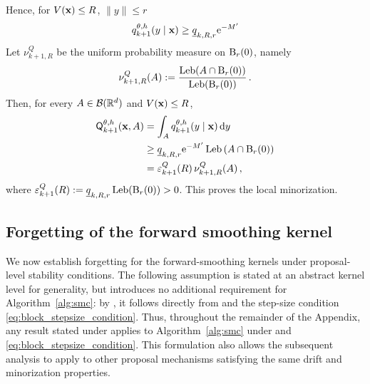 \documentclass[11pt]{article}
\theoremstyle{plain}
\theoremstyle{definition}
\theoremstyle{remark}
\begin{document}
Hence, for $V(\x)\le R$, $\|y\|\le r$
$$
q_{k+1}^{\theta,h}(y\mid\x) \ge \underline{q}_{k,R,r} \rme^{-M'}
$$
Let $\nu_{k+1,R}^Q$ be the uniform probability measure on $\ball{0}{r}$, namely
$$
\nu_{k+1,R}^Q(A) \eqdef \frac{ \operatorname{Leb}(A\cap\ball{0}{r}) }{ \operatorname{Leb}(\ball{0}{r})
} \eqsp.
$$
Then, for every $A\in\borelians{\rset^\xdim}$ and $V(\x)\le R$,
%
\begin{align*}
\mk{k+1}[\theta,h](\x,A)
&= \int_A q_{k+1}^{\theta,h}(y\mid\x)\,\rmd y\\
&\ge \underline q_{k,R,r} \rme^{-M'} \operatorname{Leb} \left( A \cap \ball{0}{r} \right)\\
&= \varepsilon_{k+1}^Q(R)\, \nu_{k+1,R}^Q(A) \eqsp,
\end{align*}
where $\varepsilon_{k+1}^Q(R) \eqdef \underline q_{k,R,r} \operatorname{Leb}\!\left(\ball{0}{r}\right)>0$. This proves the local minorization.















\subsection{Forgetting of the forward smoothing kernel}


We now establish forgetting for the forward-smoothing kernels under proposal-level stability conditions. The following assumption is stated at an abstract kernel level for generality, but introduces no additional requirement for Algorithm~\ref{alg:smc}: by , it follows directly from  and the step-size condition \eqref{eq:block_stepsize_condition}. Thus, throughout the remainder of the Appendix, any result stated under  applies to Algorithm~\ref{alg:smc} under  and \eqref{eq:block_stepsize_condition}. This formulation also allows the subsequent analysis to apply to other proposal mechanisms satisfying the same drift and minorization properties.
\end{document}
